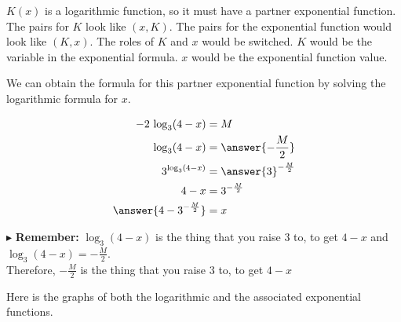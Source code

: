 \documentclass{ximera}
\begin{document}
$K(x)$ is a logarithmic function, so it must have a partner exponential function.  The pairs for $K$ look like $(x, K)$. The pairs for the exponential function would look like $(K, x)$.  The roles of $K$ and $x$ would be switched. $K$ would be the variable in the exponential formula. $x$ would be the exponential function value.


We can obtain the formula for this partner exponential function by solving the logarithmic formula for $x$.



\begin{explanation}

\begin{align*}
-2 \,\log_3(4-x) & = M \\
\log_3(4-x) & = \answer{-\frac{M}{2}} \\
3^{\log_3(4-x)} & = \answer{3}^{-\frac{M}{2}} \\
4 - x & = 3^{-\frac{M}{2}} \\
\answer{4 - 3^{-\frac{M}{2}}} & = x \\
\end{align*}

\end{explanation}




$\blacktriangleright$ \textbf{Remember:} $\log_3(4-x)$ is the thing that you raise $3$ to, to get $4-x$ and $\log_3(4-x) = - \frac{M}{2}$.  \\

Therefore, $- \frac{M}{2}$ is the thing that you raise $3$ to, to get $4-x$





Here is the graphs of both the logarithmic and the associated exponential functions.
\end{document}
